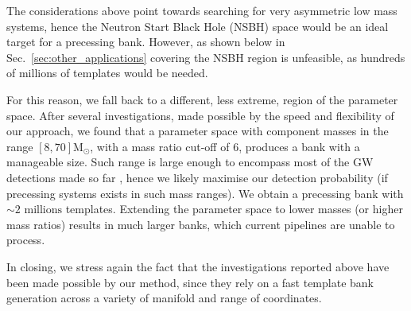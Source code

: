 \documentclass[twocolumn,showpacs,preprintnumbers,nofootinbib,prd,
superscriptaddress,10pt]{revtex4-2}
\begin{document}
The considerations above point towards searching for very asymmetric low mass systems, hence the Neutron Start Black Hole (NSBH) space would be an ideal target for a precessing bank. However, as shown below in Sec.~\ref{sec:other_applications} covering the NSBH region is unfeasible, as hundreds of millions of templates would be needed.

For this reason, we fall back to a different, less extreme, region of the parameter space. After several investigations, made possible by the speed and flexibility of our approach, we found that a parameter space with component masses in the range $[8, 70] \mathrm{M_\odot}$, with a mass ratio cut-off of $6$, produces a bank with a manageable size.
Such range is large enough to encompass most of the GW detections made so far \cite{LIGOScientific:2020kqk, KAGRA:2021duu}, hence we likely maximise our detection probability (if precessing systems exists in such mass ranges).
We obtain a precessing bank with $\sim 2 \text{ millions}$ templates. Extending the parameter space to lower masses (or higher mass ratios) results in much larger banks, which current pipelines are unable to process.

In closing, we stress again the fact that the investigations reported above have been made possible by our method, since they rely on a fast template bank generation across a variety of manifold and range of coordinates.
\end{document}
